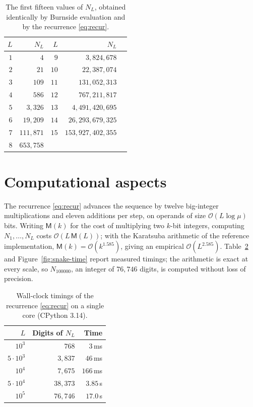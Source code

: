 \documentclass[11pt,a4paper]{article}
\theoremstyle{plain}
\theoremstyle{definition}
\theoremstyle{remark}
\newcommand{\bigO}{\mathcal{O}}
\numberwithin{equation}{section}
\begin{document}
\begin{table}[htbp]
\centering
\caption{The first fifteen values of $N_L$, obtained identically by
Burnside evaluation and by the recurrence \eqref{eq:recur}.}
\label{tab:vals}
\smallskip
\small
\begin{tabular}{@{}r r r r r@{}}
\toprule
$L$ & $N_L$ & $L$ & $N_L$ \\
\midrule
$1$ & $4$ & $9$ & $3{,}824{,}678$ \\
$2$ & $21$ & $10$ & $22{,}387{,}074$ \\
$3$ & $109$ & $11$ & $131{,}052{,}313$ \\
$4$ & $586$ & $12$ & $767{,}211{,}817$ \\
$5$ & $3{,}326$ & $13$ & $4{,}491{,}420{,}695$ \\
$6$ & $19{,}209$ & $14$ & $26{,}293{,}679{,}325$ \\
$7$ & $111{,}871$ & $15$ & $153{,}927{,}402{,}355$ \\
$8$ & $653{,}758$ & & \\
\bottomrule
\end{tabular}
\end{table}

\section{Computational aspects}\label{sec:computation}

The recurrence \eqref{eq:recur} advances the sequence by twelve
big-integer multiplications and eleven additions per step, on operands of
size $\bigO(L\log\mu)$ bits. Writing $\mathsf M(k)$ for the cost of
multiplying two $k$-bit integers, computing $N_1,\dots,N_L$ costs
$\bigO(L\,\mathsf M(L))$; with the Karatsuba arithmetic of the reference
implementation, $\mathsf M(k)=\bigO(k^{1.585})$, giving an empirical
$\bigO(L^{2.585})$. Table~\ref{tab:timing} and Figure~\ref{fig:snake-time}
report measured timings; the arithmetic is exact at every scale, so
$N_{100000}$, an integer of $76{,}746$ digits, is computed without loss of
precision.

\begin{table}[htbp]
\centering
\caption{Wall-clock timings of the recurrence \eqref{eq:recur} on a single
core (CPython 3.14).}
\label{tab:timing}
\smallskip
\small
\begin{tabular}{@{}r r r@{}}
\toprule
$L$ & Digits of $N_L$ & Time \\
\midrule
$10^{3}$ & $768$ & $3$\,ms \\
$5\cdot10^{3}$ & $3{,}837$ & $46$\,ms \\
$10^{4}$ & $7{,}675$ & $166$\,ms \\
$5\cdot10^{4}$ & $38{,}373$ & $3.85$\,s \\
$10^{5}$ & $76{,}746$ & $17.0$\,s \\
\bottomrule
\end{tabular}
\end{table}
\end{document}

